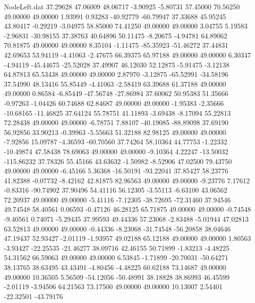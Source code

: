 \begin{filecontents}{NodeLeft.dat}
  37.29628   47.06009   48.06717    -3.90925   -5.80731   57.45000   70.56250   49.00000   49.00000    1.93991    0.93283  -40.92779  -60.79947
  37.33688   45.95245   43.80417    -0.29219   -3.04975   58.85000   74.41250   49.00000   49.00000    3.04755    5.19583   -2.96831  -30.98155
  37.38763   40.64896   50.11475    -8.20675   -4.94781   64.89062   70.81875   49.00000   49.00000    8.35104   -1.11475  -85.35923  -51.46272
  37.44831   42.69653   53.94119    -4.41063   -2.47675   66.39375   65.97188   49.00000   49.00000    6.30347   -4.94119  -45.44675  -25.52028
  37.49907   46.12030   52.12875    -5.91475   -3.12138   64.87813   65.53438   49.00000   49.00000    2.87970   -3.12875  -65.52991  -34.58196
  37.54990   48.13416   55.85449    -4.41063   -2.58419   63.39688   61.37188   49.00000   49.00000    0.86584   -6.85449  -47.56748  -27.86984
  37.60062   50.95383   51.35666    -0.97263   -1.04426   60.74688   62.84687   49.00000   49.00000   -1.95383   -2.35666  -10.68165  -11.46825
  37.64124   55.78751   41.11893    -3.69438   -8.17094   55.22813   72.28438   49.00000   49.00000   -6.78751    7.88107  -40.19085  -88.89098
  37.69190   56.92856   33.90213    -0.39963   -5.55663   51.32188   82.98125   49.00000   49.00000   -7.92856   15.09787   -4.36593  -60.70560
  37.74264   58.10364   44.77753    -1.22332  -10.49874   47.58438   78.69063   49.00000   49.00000   -9.10364    4.22247  -13.50032 -115.86232
  37.78326   55.45166   43.63632    -1.50982   -8.52906   47.02500   79.43750   49.00000   49.00000   -6.45166    5.36368  -16.50191  -93.22041
  37.85427   58.23776   41.82388    -0.07732   -8.42162   42.81875   82.96563   49.00000   49.00000   -9.23776    7.17612   -0.83316  -90.74902
  37.90496   54.41116   56.12305    -3.55113   -6.63100   43.06562   72.20937   49.00000   49.00000   -5.41116   -7.12305  -38.72695  -72.31460
  37.94546   49.74548   58.40561     0.06593   -0.47126   46.28125   65.71875   49.00000   49.00000   -0.74548   -9.40561    0.74071   -5.29435
  37.99593   49.44336   57.23068    -2.83488   -5.01944   47.02813   63.52813   49.00000   49.00000   -0.44336   -8.23068  -31.74548  -56.20858
  38.04646   47.19437   52.93427    -2.01119   -1.93957   49.02188   65.12188   49.00000   49.00000    1.80563   -3.93427  -22.25535  -21.46277
  38.09716   42.46155   50.71899    -1.83213   -4.48225   54.31562   66.59063   49.00000   49.00000    6.53845   -1.71899  -20.70031  -50.64271
  38.13765   38.63495   43.43491    -4.80456   -4.48225   60.62188   73.14687   49.00000   49.00000   10.36505    5.56509  -54.12056  -50.48991
  38.18828   38.86993   46.45599    -2.01119   -3.94506   64.21563   73.17500   49.00000   49.00000   10.13007    2.54401  -22.32501  -43.79176

\end{filecontents}
